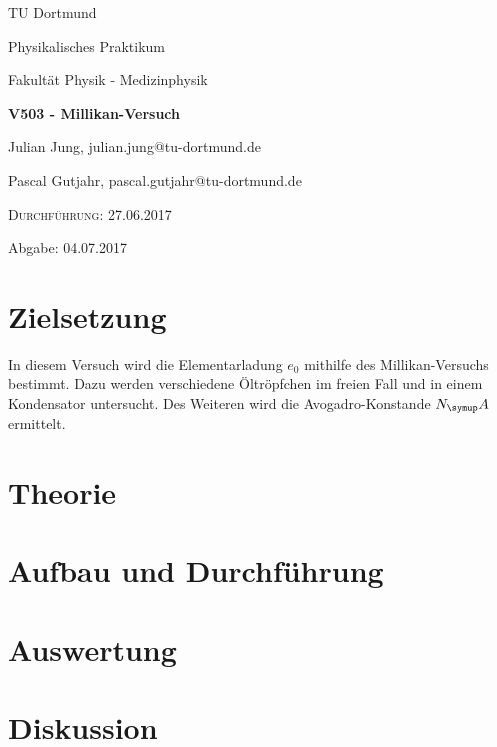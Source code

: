 


\begin{titlepage}
  \centering
  {\LARGE TU Dortmund \par}
  \vspace{0.75cm}
  {\Large Physikalisches Praktikum \par}
  \vspace{0.75cm}
  {\Large Fakultät Physik - Medizinphysik \par}
  \vspace{4cm}
  {\LARGE \bfseries V503 - Millikan-Versuch \par}
  \vspace{4cm}
  {\large Julian Jung, julian.jung@tu-dortmund.de \par \vspace{0.25cm}
  Pascal Gutjahr, pascal.gutjahr@tu-dortmund.de \par}
  \vspace{6cm}
  {\scshape Durchführung: 27.06.2017 \par \vspace{0.25cm}
  Abgabe: 04.07.2017}
\end{titlepage}
\newpage
\tableofcontents
\newpage
\section{Zielsetzung}
In diesem Versuch wird die Elementarladung $e_0$ mithilfe des Millikan-Versuchs bestimmt.
Dazu werden verschiedene Öltröpfchen im freien Fall und in einem Kondensator untersucht.
Des Weiteren wird die Avogadro-Konstande $N_\su{A}$ ermittelt. 
\section{Theorie}
 
\section{Aufbau und Durchführung}
 
\section{Auswertung}
 
\section{Diskussion}

\printbibliography

